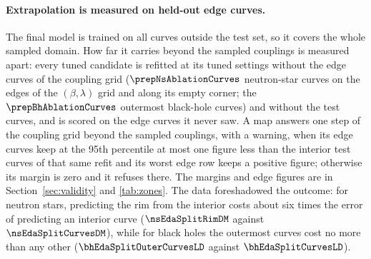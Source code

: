 \paragraph{Extrapolation is measured on held-out edge curves.}
The final model is trained on all curves outside the test set, so it covers the whole sampled domain. How far it carries beyond the sampled couplings is measured apart: every tuned candidate is refitted at its tuned settings without the edge curves of the coupling grid ($\prepNsAblationCurves$ neutron-star curves on the edges of the $(\beta, \lambda)$ grid and along its empty corner; the $\prepBhAblationCurves$ outermost black-hole curves) and without the test curves, and is scored on the edge curves it never saw. A map answers one step of the coupling grid beyond the sampled couplings, with a warning, when its edge curves keep at the 95th percentile at most one figure less than the interior test curves of that same refit and its worst edge row keeps a positive figure; otherwise its margin is zero and it refuses there. The margins and edge figures are in Section~\ref{sec:validity} and \cref{tab:zones}. The data foreshadowed the outcome: for neutron stars, predicting the rim from the interior costs about six times the error of predicting an interior curve ($\nsEdaSplitRimDM$ against $\nsEdaSplitCurvesDM$), while for black holes the outermost curves cost no more than any other ($\bhEdaSplitOuterCurvesLD$ against $\bhEdaSplitCurvesLD$).


\FloatBarrier
